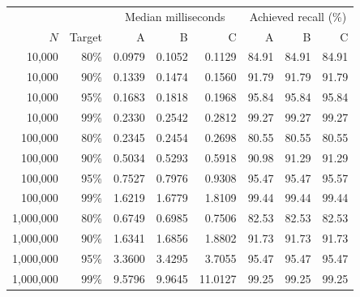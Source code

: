\begin{center}\small
\begin{tabular}{@{}rr rrr rrr@{}}\toprule
 & & \multicolumn{3}{c}{Median milliseconds} & \multicolumn{3}{c}{Achieved recall (\%)}\\
$N$ & Target & A & B & C & A & B & C\\\midrule
10,000 & 80\% & 0.0979 & 0.1052 & 0.1129 & 84.91 & 84.91 & 84.91\\
10,000 & 90\% & 0.1339 & 0.1474 & 0.1560 & 91.79 & 91.79 & 91.79\\
10,000 & 95\% & 0.1683 & 0.1818 & 0.1968 & 95.84 & 95.84 & 95.84\\
10,000 & 99\% & 0.2330 & 0.2542 & 0.2812 & 99.27 & 99.27 & 99.27\\
100,000 & 80\% & 0.2345 & 0.2454 & 0.2698 & 80.55 & 80.55 & 80.55\\
100,000 & 90\% & 0.5034 & 0.5293 & 0.5918 & 90.98 & 91.29 & 91.29\\
100,000 & 95\% & 0.7527 & 0.7976 & 0.9308 & 95.47 & 95.47 & 95.57\\
100,000 & 99\% & 1.6219 & 1.6779 & 1.8109 & 99.44 & 99.44 & 99.44\\
1,000,000 & 80\% & 0.6749 & 0.6985 & 0.7506 & 82.53 & 82.53 & 82.53\\
1,000,000 & 90\% & 1.6341 & 1.6856 & 1.8802 & 91.73 & 91.73 & 91.73\\
1,000,000 & 95\% & 3.3600 & 3.4295 & 3.7055 & 95.47 & 95.47 & 95.47\\
1,000,000 & 99\% & 9.5796 & 9.9645 & 11.0127 & 99.25 & 99.25 & 99.25\\
\bottomrule\end{tabular}\normalsize\end{center}
